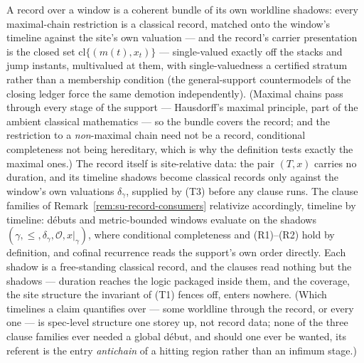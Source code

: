 A record over a window is a coherent bundle of its own worldline
shadows: every maximal-chain restriction is a classical record,
matched onto the window's timeline against the site's own valuation
--- and the record's carrier presentation is the closed set
$\mathrm{cl}\{(m(t), x_t)\}$ --- single-valued exactly off the
stacks and jump instants, multivalued at them, with
single-valuedness a certified stratum rather than a membership
condition (the general-support countermodels of the closing ledger
force the same demotion independently). (Maximal chains pass through every stage of
the support --- Hausdorff's maximal principle, part of the ambient
classical mathematics --- so the bundle covers the record; and the
restriction to a \emph{non}-maximal chain need not be a record,
conditional completeness not being hereditary, which is why the
definition tests exactly the maximal ones.) The record itself is
site-relative data: the pair $(T, x)$ carries no duration, and its
timeline shadows become classical records only against the window's
own valuations $\delta_\gamma$, supplied by (T3) before any clause
runs. The clause families of
Remark~\ref{rem:su-record-consumers} relativize accordingly,
timeline by
timeline: d\'ebuts and metric-bounded windows evaluate on the
shadows $(\gamma, \le, \delta_\gamma, \mathcal{O}, x|_\gamma)$,
where conditional completeness and
(R1)--(R2) hold by definition, and cofinal recurrence reads the
support's own order directly. Each shadow is a free-standing
classical record, and the clauses read nothing but the shadows ---
duration reaches the logic packaged inside them, and the coverage,
the site structure the invariant of (T1) fences off, enters
nowhere. (Which timelines a claim quantifies over --- some worldline
through the record, or every one --- is spec-level structure one
storey up, not record data; none of the three clause families ever
needed a global d\'ebut, and should one ever be wanted, its
referent is the entry \emph{antichain} of a hitting region rather
than an infimum stage.)

